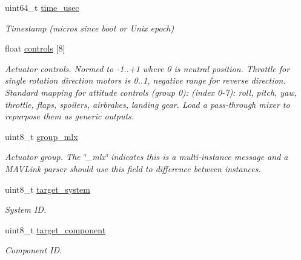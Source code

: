 \begin{DoxyCompactItemize}
\item 
uint64\+\_\+t \hyperlink{struct____mavlink__set__actuator__control__target__t_a13c23f3e184517bf2243d92c8af35a25}{time\+\_\+usec}
\begin{DoxyCompactList}\small\item\em Timestamp (micros since boot or Unix epoch) \end{DoxyCompactList}\item 
float \hyperlink{struct____mavlink__set__actuator__control__target__t_a368c78b9f260d721473ba1cb5e54b7e5}{controls} \mbox{[}8\mbox{]}
\begin{DoxyCompactList}\small\item\em Actuator controls. Normed to -\/1..+1 where 0 is neutral position. Throttle for single rotation direction motors is 0..1, negative range for reverse direction. Standard mapping for attitude controls (group 0)\+: (index 0-\/7)\+: roll, pitch, yaw, throttle, flaps, spoilers, airbrakes, landing gear. Load a pass-\/through mixer to repurpose them as generic outputs. \end{DoxyCompactList}\item 
uint8\+\_\+t \hyperlink{struct____mavlink__set__actuator__control__target__t_ae8bc441bf68fc3e1a7abe5189318b878}{group\+\_\+mlx}
\begin{DoxyCompactList}\small\item\em Actuator group. The \char`\"{}\+\_\+mlx\char`\"{} indicates this is a multi-\/instance message and a M\+A\+V\+Link parser should use this field to difference between instances. \end{DoxyCompactList}\item 
uint8\+\_\+t \hyperlink{struct____mavlink__set__actuator__control__target__t_a2a69f07a7df0ccb3b284c162ad8df044}{target\+\_\+system}
\begin{DoxyCompactList}\small\item\em System I\+D. \end{DoxyCompactList}\item 
uint8\+\_\+t \hyperlink{struct____mavlink__set__actuator__control__target__t_ade081eed7081a4730b43a351260713a5}{target\+\_\+component}
\begin{DoxyCompactList}\small\item\em Component I\+D. \end{DoxyCompactList}\end{DoxyCompactItemize}


